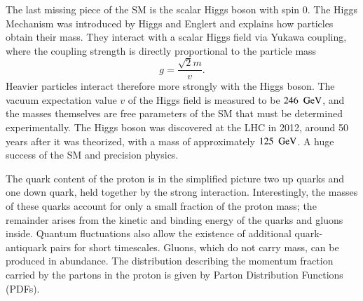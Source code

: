 The last missing piece of the SM is the scalar Higgs boson with spin 0.
The Higgs Mechanism was introduced by Higgs and Englert and 
explains how particles obtain their mass.
They interact with a scalar Higgs field via Yukawa coupling, where the coupling strength is directly proportional to the particle mass
\begin{equation}
    g = \frac{\sqrt{2}m}{v}.
\end{equation}
Heavier particles interact therefore more strongly with the Higgs boson.
The vacuum expectation value $v$ of the Higgs field is measured to be $246~~\text{GeV}$,
and the masses themselves are free parameters of the SM that must be determined experimentally.
The Higgs boson was discovered at the LHC in 2012, around 50 years after
it was theorized, with a mass of approximately $125~~\text{GeV}$.
A huge success of the SM and precision physics.

The quark content of the proton is in the simplified picture two up quarks and
one down quark, held together by the strong interaction.
Interestingly, the masses of these quarks account for only a small fraction of the proton mass; the remainder arises from the kinetic and binding energy of the quarks and gluons inside.
Quantum fluctuations also allow the existence of additional quark-antiquark pairs for short timescales.
Gluons, which do not carry mass, can be produced in abundance.
The distribution describing the momentum fraction carried by the partons in the proton is given by Parton Distribution Functions (PDFs).


